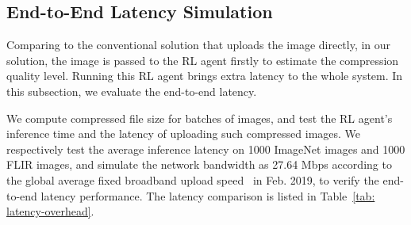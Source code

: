 \subsection{End-to-End Latency Simulation}

Comparing to the conventional solution that uploads the image directly, in our solution, the image is passed to the RL agent firstly to estimate the compression quality level. Running this RL agent brings extra latency to the whole system. In this subsection, we evaluate the end-to-end latency. %

We compute compressed file size for batches of images, and test the RL agent's inference time and the latency of uploading such compressed images. \textcolor{revise}{We respectively test the average inference latency on 1000 ImageNet images and 1000 FLIR images}, and simulate the network bandwidth as 27.64 Mbps according to the global average fixed broadband upload speed~\cite{speedtest} in Feb. 2019, to verify the end-to-end latency performance. The latency comparison is listed in Table~\ref{tab: latency-overhead}. %


